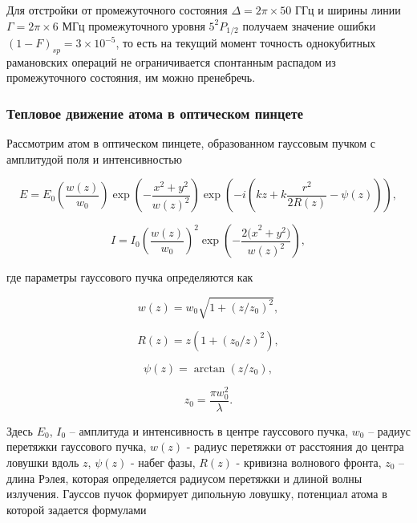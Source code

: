 Для отстройки от промежуточного состояния $\Delta = 2\pi \times 50 \text{ ГГц}$ и ширины линии $\Gamma = 2\pi \times 6 \text{ МГц}$ \cite{Rb87} промежуточного уровня $5^2P_{1/2}$ получаем значение ошибки $(1-F)_{sp} = 3 \times 10^{-5}$, то есть на текущий момент точность однокубитных рамановских операций не ограничивается спонтанным распадом из промежуточного состояния, им можно пренебречь.

\subsubsection{Тепловое движение атома в оптическом пинцете}
\label{sec:monte_carlo}

Рассмотрим атом в оптическом пинцете, образованном гауссовым пучком с амплитудой поля и интенсивностью

\begin{equation}
	E=E_0\left(\frac{w\left(z\right)}{w_0}\right)\exp\left(-\frac{x^2+y^2}{w\left(z\right)^2}\right)\exp{\left(-i\left(kz+k\frac{r^2}{2R\left(z\right)}-\psi\left(z\right)\right)\right)},    
\end{equation}

\begin{equation}
	I=I_0\left(\frac{w\left(z\right)}{w_0}\right)^2\exp\left(-\frac{{2(x}^2+y^2)}{w\left(z\right)^2}\right),
\end{equation}

где параметры гауссового пучка определяются как

\begin{equation}
	w\left(z\right)=w_0\sqrt{1+\left(z/z_0\right)^2},
\end{equation}

\begin{equation}
	R\left(z\right)=z\left(1+\left(z_0/z\right)^2\right),
\end{equation}

\begin{equation}
	\psi\left(z\right)=\arctan\left(z/z_0\right),
\end{equation}

\begin{equation}
	z_0=\frac{\pi w_0^2}{\lambda}.
\end{equation}

Здесь $E_0$, $I_0$ – амплитуда и интенсивность в центре гауссового пучка, $w_0$ – радиус перетяжки гауссового пучка, $w\left(z\right)$ - радиус перетяжки от расстояния до центра ловушки вдоль $z$, $\psi\left(z\right)$ - набег фазы, $R\left(z\right)$ - кривизна волнового фронта, $z_0$ – длина Рэлея, которая определяется радиусом перетяжки и длиной волны излучения. Гауссов пучок формирует дипольную ловушку, потенциал атома в которой задается формулами \cite{grimm1999optical}


